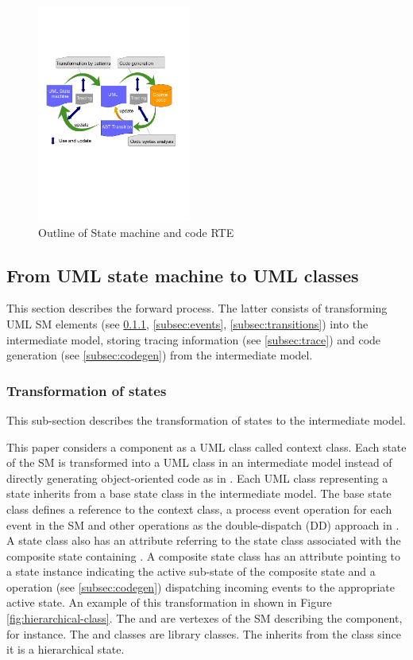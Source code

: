 \begin{figure}
\centering
\includegraphics[clip, trim=0.5cm 10.4cm 0.5cm 7.0cm, width=0.45\textwidth]{figures/rte}
\caption{Outline of State machine and code RTE} 
\label{fig:outline}
\end{figure}

\subsection{From UML state machine to UML classes}
This section describes the forward process. The latter consists of transforming UML SM elements (see \ref{subsec:states}, \ref{subsec:events}, \ref{subsec:transitions}) into the intermediate model, storing tracing information (see \ref{subsec:trace}) and code generation (see \ref{subsec:codegen}) from the intermediate model.

\subsubsection{Transformation of states}
\label{subsec:states}
This sub-section describes the transformation of states to the intermediate model. 

This paper considers a component as a UML class called context class. Each state of the SM is transformed into a UML class in an intermediate model instead of directly generating object-oriented code as in \cite{Niaz2005}. Each UML class representing a state inherits from a base state class in the intermediate model. The base state class defines a reference to the context class, a process event operation for each event in the SM and other operations as the double-dispatch (DD) approach in \cite{spinke_object-oriented_2013}. A state class  also has an attribute referring to the state class associated with the composite state containing . A composite state class has an attribute pointing to a state instance indicating the active sub-state of the composite state and a  operation (see \ref{subsec:codegen}) dispatching incoming events to the appropriate active state. An example of this transformation in shown in Figure \ref{fig:hierarchical-class}. The  and  are vertexes of the SM describing the  component, for instance. The  and  classes are library classes. The  inherits from the  class since it is a hierarchical state.

